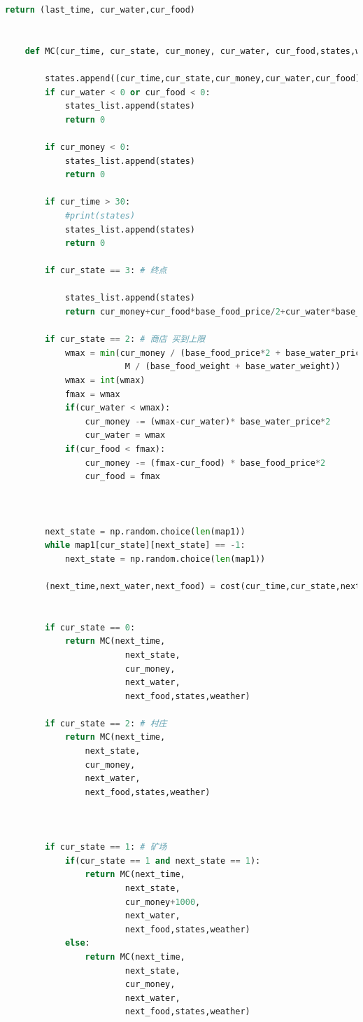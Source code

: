 \documentclass[withoutpreface,bwprint]{cumcmthesis} %
\begin{document}
\begin{appendices}
\begin{lstlisting}[language=python]
        return (last_time, cur_water,cur_food)
    
    
    def MC(cur_time, cur_state, cur_money, cur_water, cur_food,states,weather):
    
        states.append((cur_time,cur_state,cur_money,cur_water,cur_food))
        if cur_water < 0 or cur_food < 0:
            states_list.append(states)
            return 0
    
        if cur_money < 0:
            states_list.append(states)
            return 0        
    
        if cur_time > 30:
            #print(states)
            states_list.append(states)
            return 0
    
        if cur_state == 3: # 终点
    
            states_list.append(states)
            return cur_money+cur_food*base_food_price/2+cur_water*base_water_price/2
    
        if cur_state == 2: # 商店 买到上限
            wmax = min(cur_money / (base_food_price*2 + base_water_price*2),
                        M / (base_food_weight + base_water_weight))
            wmax = int(wmax)
            fmax = wmax
            if(cur_water < wmax):
                cur_money -= (wmax-cur_water)* base_water_price*2
                cur_water = wmax
            if(cur_food < fmax):
                cur_money -= (fmax-cur_food) * base_food_price*2
                cur_food = fmax
    
    
    
        next_state = np.random.choice(len(map1))
        while map1[cur_state][next_state] == -1:
            next_state = np.random.choice(len(map1))
    
        (next_time,next_water,next_food) = cost(cur_time,cur_state,next_state,cur_water,cur_food,states,weather)
    
    
        if cur_state == 0:
            return MC(next_time, 
                        next_state, 
                        cur_money, 
                        next_water, 
                        next_food,states,weather)
    
        if cur_state == 2: # 村庄
            return MC(next_time, 
                next_state, 
                cur_money, 
                next_water, 
                next_food,states,weather)
                    
    
    
        if cur_state == 1: # 矿场
            if(cur_state == 1 and next_state == 1):
                return MC(next_time, 
                        next_state, 
                        cur_money+1000, 
                        next_water, 
                        next_food,states,weather)
            else:
                return MC(next_time, 
                        next_state, 
                        cur_money, 
                        next_water, 
                        next_food,states,weather)
               

\end{lstlisting}
\end{appendices}
\end{document}

